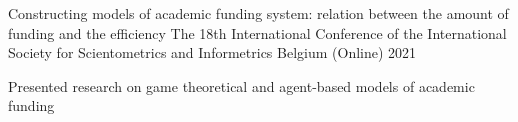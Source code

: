 \begin{cventries}

%
%
%
  \cventry
    {Constructing models of academic funding system: relation between the amount of funding and the efficiency} %
    {The 18th International Conference of the International Society for Scientometrics and Informetrics} %
    {Belgium (Online)} %
    {2021} %
    {
      \begin{cvitems} %
        \item {Presented research on game theoretical and agent-based models of academic funding}
      \end{cvitems}
    }


\end{cventries}
